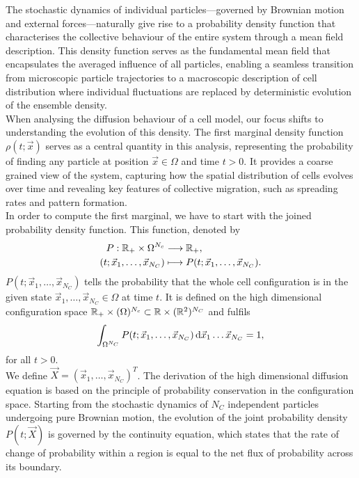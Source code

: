 The stochastic dynamics of individual particles—governed by Brownian motion and external forces—naturally give rise to a probability density function that characterises the collective behaviour of the entire system through a mean field description. 
This density function serves as the fundamental mean field that encapsulates the averaged influence of all particles, enabling a seamless transition from microscopic particle trajectories to a macroscopic description of cell distribution where individual fluctuations are replaced by deterministic evolution of the ensemble density. \\
When analysing the diffusion behaviour of a cell model, our focus shifts to understanding the evolution of this density. 
The first marginal density function $\rho(t; \vec{x})$ serves as a central quantity in this analysis, representing the probability of finding any particle at position $\vec{x} \in \Omega$ and time $t > 0$. 
It provides a coarse grained view of the system, capturing how the spatial distribution of cells evolves over time and revealing key features of collective migration, such as spreading rates and pattern formation. \\ 
In order to compute the first marginal, we have to start with the joined probability density function. 
This function, denoted by 
\begin{align*}
	P : \mathbb{R}_{+} \times \Omega^{N_c} &\longrightarrow  \mathbb{R}_+, \\	
	(t; \vec{x}_1, \ldots, \vec{x}_{N_C}) &\longmapsto  P(t; \vec{x}_1, \ldots, \vec{x}_{N_C}).
\end{align*}	
$P(t; \vec{x}_1, \ldots, \vec{x}_{N_C})$ tells the probability that the whole cell configuration is in the given state $\vec{x}_1, \ldots, \vec{x}_{N_C} \in \Omega$ at time $t$. 
It is defined on the high dimensional configuration space $\mathbb{R}_{+} \times (\Omega)^{N_c} \subset \mathbb{R} \times (\mathbb{R}^2)^{N_C}$ and fulfils
\[
	\int_{\Omega^{N_C}} P(t; \vec{x}_1, \ldots, \vec{x}_{N_C}) \, \mathrm{d} \vec{x}_1 \ldots \vec{x}_{N_C} = 1, 
\]
for all $t>0$. \\ 
We define $\vec{X} = (\vec{x}_1, \ldots, \vec{x}_{N_C})^T$. 
The derivation of the high dimensional diffusion equation is based on the principle of probability conservation in the configuration space. Starting from the stochastic dynamics of $N_C$ independent particles undergoing pure Brownian motion, the evolution of the joint probability density $P(t; \vec{X})$ is governed by the continuity equation, which states that the rate of change of probability within a region is equal to the net flux of probability across its boundary. \\ 
